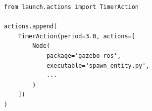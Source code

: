 \begin{figure}[t]
\centering
\begin{lstlisting}[style=python,
    caption={Estructura básica de TimerAction.},
    label={lst:timer_basico}]
from launch.actions import TimerAction

actions.append(
    TimerAction(period=3.0, actions=[
        Node(
            package='gazebo_ros',
            executable='spawn_entity.py',
            ...
        )
    ])
)
\end{lstlisting}
\end{figure}
